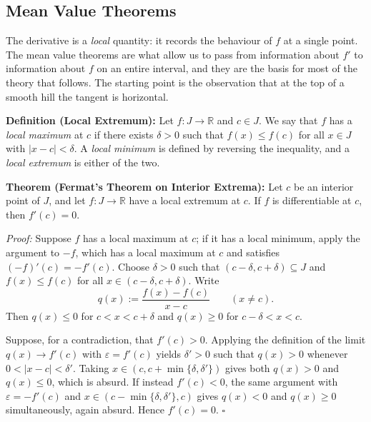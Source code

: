 \documentclass[a4paper,11pt,abstracton]{scrartcl}
\newcommand{\RR}{\mathbb{R}}
\theoremstyle{dotlessP}
\theoremstyle{dotlessS}
\theoremstyle{remark}
\theoremstyle{definition}
\begin{document}
\subsection{Mean Value Theorems}

The derivative is a \emph{local} quantity: it records the behaviour of $f$ at a single point. The mean value theorems are what allow us to pass from information about $f'$ to information about $f$ on an entire interval, and they are the basis for most of the theory that follows. The starting point is the observation that at the top of a smooth hill the tangent is horizontal.

\begin{problem_box}
\textbf{Definition (Local Extremum):}
Let $f:J\to\RR$ and $c\in J$. We say that $f$ has a \emph{local maximum} at $c$ if there exists $\delta>0$ such that $f(x)\le f(c)$ for all $x\in J$ with $|x-c|<\delta$. A \emph{local minimum} is defined by reversing the inequality, and a \emph{local extremum} is either of the two.
\end{problem_box}

\begin{problem_box}
\textbf{Theorem (Fermat's Theorem on Interior Extrema):}
Let $c$ be an interior point of $J$, and let $f:J\to\RR$ have a local extremum at $c$. If $f$ is differentiable at $c$, then $f'(c)=0$.
\end{problem_box}

\begin{claim_box}
\textit{Proof:}
Suppose $f$ has a local maximum at $c$; if it has a local minimum, apply the argument to $-f$, which has a local maximum at $c$ and satisfies $(-f)'(c)=-f'(c)$. Choose $\delta>0$ such that $(c-\delta,c+\delta)\subseteq J$ and $f(x)\le f(c)$ for all $x\in(c-\delta,c+\delta)$. Write
\[
    q(x):=\frac{f(x)-f(c)}{x-c}\qquad(x\ne c).
\]
Then $q(x)\le0$ for $c<x<c+\delta$ and $q(x)\ge0$ for $c-\delta<x<c$.

Suppose, for a contradiction, that $f'(c)>0$. Applying the definition of the limit $q(x)\to f'(c)$ with $\varepsilon=f'(c)$ yields $\delta'>0$ such that $q(x)>0$ whenever $0<|x-c|<\delta'$. Taking $x\in(c,c+\min\{\delta,\delta'\})$ gives both $q(x)>0$ and $q(x)\le0$, which is absurd. If instead $f'(c)<0$, the same argument with $\varepsilon=-f'(c)$ and $x\in(c-\min\{\delta,\delta'\},c)$ gives $q(x)<0$ and $q(x)\ge0$ simultaneously, again absurd. Hence $f'(c)=0$.
\hfill$\square$
\end{claim_box}
\end{document}
